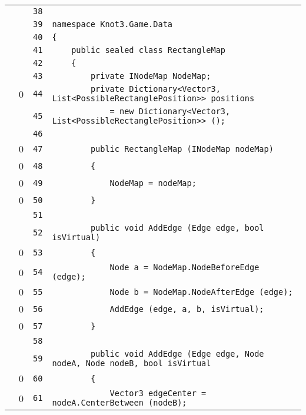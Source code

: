 \documentclass[a4paper,10pt]{article}
\begin{document}
\begin{longtable}[l]{lrrl}
\cellcolor{gray} &  & \verb~38~ & \verb~~\\
\cellcolor{gray} &  & \verb~39~ & \verb~namespace Knot3.Game.Data~\\
\cellcolor{gray} &  & \verb~40~ & \verb~{~\\
\cellcolor{gray} &  & \verb~41~ & \verb~    public sealed class RectangleMap~\\
\cellcolor{gray} &  & \verb~42~ & \verb~    {~\\
\cellcolor{gray} &  & \verb~43~ & \verb~        private INodeMap NodeMap;~\\
\cellcolor{red} & 0 & \verb~44~ & \verb~        private Dictionary<Vector3, List<PossibleRectanglePosition>> positions~\\
\cellcolor{gray} &  & \verb~45~ & \verb~            = new Dictionary<Vector3, List<PossibleRectanglePosition>> ();~\\
\cellcolor{gray} &  & \verb~46~ & \verb~~\\
\cellcolor{red} & 0 & \verb~47~ & \verb~        public RectangleMap (INodeMap nodeMap)~\\
\cellcolor{red} & 0 & \verb~48~ & \verb~        {~\\
\cellcolor{red} & 0 & \verb~49~ & \verb~            NodeMap = nodeMap;~\\
\cellcolor{red} & 0 & \verb~50~ & \verb~        }~\\
\cellcolor{gray} &  & \verb~51~ & \verb~~\\
\cellcolor{gray} &  & \verb~52~ & \verb~        public void AddEdge (Edge edge, bool isVirtual)~\\
\cellcolor{red} & 0 & \verb~53~ & \verb~        {~\\
\cellcolor{red} & 0 & \verb~54~ & \verb~            Node a = NodeMap.NodeBeforeEdge (edge);~\\
\cellcolor{red} & 0 & \verb~55~ & \verb~            Node b = NodeMap.NodeAfterEdge (edge);~\\
\cellcolor{red} & 0 & \verb~56~ & \verb~            AddEdge (edge, a, b, isVirtual);~\\
\cellcolor{red} & 0 & \verb~57~ & \verb~        }~\\
\cellcolor{gray} &  & \verb~58~ & \verb~~\\
\cellcolor{gray} &  & \verb~59~ & \verb~        public void AddEdge (Edge edge, Node nodeA, Node nodeB, bool isVirtual~\\
\cellcolor{red} & 0 & \verb~60~ & \verb~        {~\\
\cellcolor{red} & 0 & \verb~61~ & \verb~            Vector3 edgeCenter = nodeA.CenterBetween (nodeB);~\\

\end{longtable}
\end{document}
